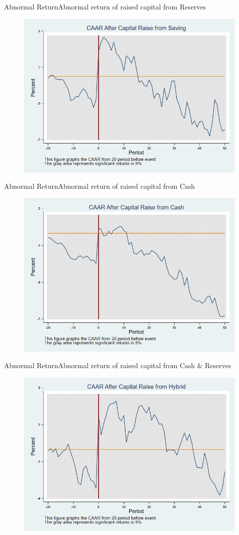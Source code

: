 \documentclass{beamer}
\begin{document}
\begin{frame}{Abnormal Return}{Abnormal return of raised capital from Reserves}
	\label{car_marketindustrySaving}
	\begin{figure}
		\centering
		\includegraphics[width=0.65\linewidth]{Output/car_marketindustrySaving}
		\label{fig:car_marketindustrySaving}
	\end{figure}
	
\end{frame}


\begin{frame}{Abnormal Return}{Abnormal return of raised capital from Cash}
	\label{car_marketindustryCash}
	\begin{figure}
		\centering
		\includegraphics[width=0.65\linewidth]{Output/car_marketindustryCash}
		\label{fig:car_marketindustryCash}
	\end{figure}
\end{frame}


\begin{frame}{Abnormal Return}{Abnormal return of raised capital from Cash \& Reserves}
	\label{car_marketindustryHybrid}
	\begin{figure}
		\centering
		\includegraphics[width=0.65\linewidth]{Output/car_marketindustryHybrid}
		\label{fig:car_marketindustryHybrid}
	\end{figure}
\end{frame}
\end{document}
